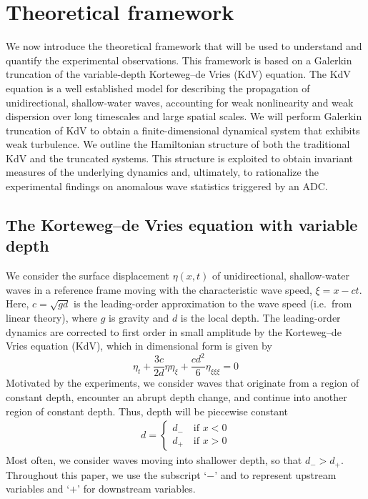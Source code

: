 \documentclass[11pt]{article}
\newcommand{\depth}{d}
\newcommand{\dup}{\depth_{-}}
\newcommand{\ddn}{\depth_{+}}
\begin{document}
\section{Theoretical framework}
\label{theory}

We now introduce the theoretical framework that will be used to understand and quantify the experimental observations. This framework is based on a Galerkin truncation of the variable-depth Korteweg–de Vries (KdV) equation. The KdV equation is a well established model for describing the propagation of unidirectional, shallow-water waves, accounting for weak nonlinearity and weak dispersion over long timescales and large spatial scales. We will perform Galerkin truncation of KdV to obtain a finite-dimensional dynamical system that exhibits weak turbulence. We outline the Hamiltonian structure of both the traditional KdV and the truncated systems. This structure is exploited to obtain invariant measures of the underlying dynamics and, ultimately, to rationalize the experimental findings on anomalous wave statistics triggered by an ADC.


\subsection{The Korteweg–de Vries equation with variable depth}

We consider the surface displacement $\eta(x,t)$ of unidirectional, shallow-water waves in a reference frame moving with the characteristic wave speed, $\xi = x - ct$. Here, $c = \sqrt{g \depth}$ is {the} leading-order approximation to the wave speed (i.e.~from linear theory), where $g$ is gravity and $\depth$ is the local depth.
The leading-order dynamics are corrected to first order in small amplitude by the Korteweg–de Vries equation (KdV), which in dimensional form is given by \cite{whitham2011linear}
\begin{equation}
\label{KdV}
\eta_t + \frac{3 c}{2 \depth} \eta \eta_{\xi} + \frac{c \depth^2}{6} \eta_{\xi \xi \xi} = 0
\end{equation}
Motivated by the experiments, we consider waves that originate from a region of constant depth, encounter an abrupt depth change, and continue into another region of constant depth. Thus, depth will be piecewise constant
\begin{align}
\depth = 
\begin{cases}
\dup \quad \mbox{if } x<0 \\
\ddn \quad \mbox{if } x>0
\end{cases}
\end{align}
Most often, we consider waves moving into shallower depth, so that $\dup > \ddn$. Throughout this paper, we use the subscript `$-$' and to represent upstream variables and `$+$' for downstream variables.
\end{document}
